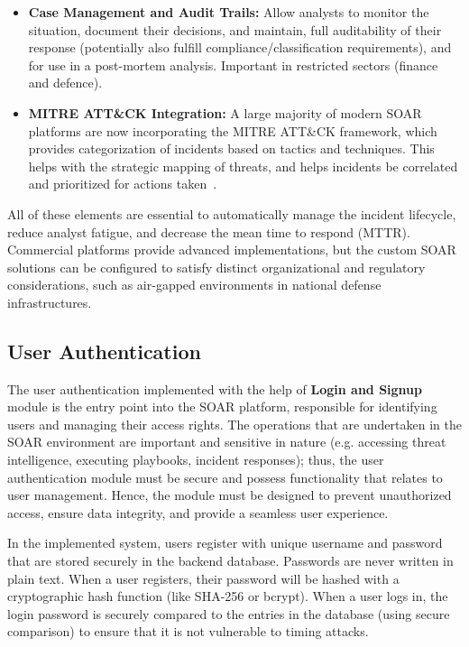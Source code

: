 \begin{itemize}
    \item \textbf{Case Management and Audit Trails:} Allow analysts to monitor the situation, document their decisions, and maintain, full auditability of their response (potentially also fulfill compliance/classification requirements), and for use in a post-mortem analysis. Important in restricted sectors (finance and defence).

    \item \textbf{MITRE ATT\&CK Integration:} A large majority of modern SOAR platforms are now incorporating the MITRE ATT\&CK framework, which provides categorization of incidents based on tactics and techniques. This helps with the strategic mapping of threats, and helps incidents be correlated and prioritized for actions taken~\cite{mitre}.
\end{itemize}

All of these elements are essential to automatically manage the incident lifecycle, reduce analyst fatigue, and decrease the mean time to respond (MTTR). Commercial platforms provide advanced implementations, but the custom SOAR solutions can be configured to satisfy distinct organizational and regulatory considerations, such as air-gapped environments in national defense infrastructures.

\subsection{User Authentication}

The user authentication implemented with the help of \textbf{Login and Signup} module is the entry point into the SOAR platform, responsible for identifying users and managing their access rights. The operations that are undertaken in the SOAR environment are important and sensitive in nature (e.g. accessing threat intelligence, executing playbooks, incident responses); thus, the user authentication module must be secure and possess functionality that relates to user management. Hence, the module must be designed to prevent unauthorized access, ensure data integrity, and provide a seamless user experience.

In the implemented system, users register with unique username and password that are stored securely in the backend database. Passwords are never written in plain text. When a user registers, their password will be hashed with a cryptographic hash function (like SHA-256 or bcrypt). When a user logs in, the login password is securely compared to the entries in the database (using secure comparison) to ensure that it is not vulnerable to timing attacks.

